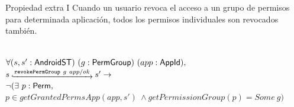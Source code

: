\documentclass[pdf, handout]{beamer} %
\begin{document}
\begin{frame}{Propiedad extra I}
    Cuando un usuario revoca el acceso a un grupo de permisos para determinada aplicación, todos los permisos individuales son revocados también.
    \begin{prop} \mbox{} \\
        \fontsize{9pt}{15pt}\selectfont
        $\forall (s,s': \mathsf{AndroidST})~(g:\mathsf{PermGroup})~(app:\mathsf{AppId}),$ \\
        $\Mathexecrel{s}{\texttt{revokePermGroup}~g~app/ok}{s'} \rightarrow$ \\
        $\neg (\exists\ p: \mathsf{Perm},$\\
        \hspace{15px}$p \in getGrantedPermsApp(app,s')\ \land getPermissionGroup(p) = Some\ g)$
    \end{prop}
\end{frame}
\end{document}
